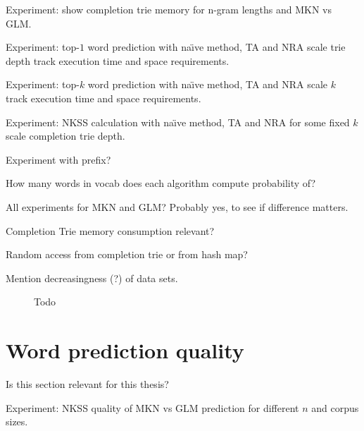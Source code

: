 \begin{draft}
Experiment: show completion trie memory for n-gram lengths and MKN vs GLM.

Experiment: top-$1$ word prediction with na\"{\i}ve method, TA and NRA scale
trie depth track execution time and space requirements.

Experiment: top-$k$ word prediction with na\"{\i}ve method, TA and NRA scale
$k$ track execution time and space requirements.

Experiment: NKSS calculation with na\"{\i}ve method, TA and NRA for some fixed
$k$ scale completion trie depth.

Experiment with prefix?

How many words in vocab does each algorithm compute probability of?

All experiments for MKN and GLM?
Probably yes, to see if difference matters.

Completion Trie memory consumption relevant?

Random access from completion trie or from hash map?

Mention decreasingness (?) of data sets.
\end{draft}

\begin{figure}
  \centering
  
  \caption{Todo}
\end{figure}


\section{Word prediction quality}

\begin{draft}
Is this section relevant for this thesis?

Experiment: NKSS quality of MKN vs GLM prediction for different $n$ and corpus
sizes.
\end{draft}
